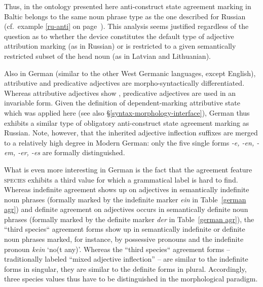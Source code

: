 Thus, in the ontology presented here anti\hyp{}construct state agreement marking in Baltic belongs to the same noun phrase type as the one described for Russian (cf.~example \ref{ru-anti} on page~\pageref{ru-anti}). This analysis seems justified regardless of the question as to whether the device constitutes the default type of adjective attribution marking (as in Russian) or is restricted to a given semantically restricted subset of the head noun (as in Latvian and Lithuanian).

Also in German (similar to the other West Germanic languages, except English), attributive and predicative adjectives are morpho-syntactically differentiated. Whereas attributive adjectives show , predicative adjectives are used in an invariable form. Given the definition of dependent\hyp{}marking attributive state which was applied here (see also \S\ref{syntax-morphology-interface}), German thus exhibits a similar type of obligatory anti\hyp{}construct state agreement marking as Russian. Note, however, that the inherited adjective inflection suffixes are merged to a relatively high degree in Modern German: only the five single forms \textit{-e, -en, -em, -er, -es} are formally distinguished.

What is even more interesting in German is the fact that the agreement feature \textsc{species} exhibits a third value for which a grammatical label is hard to find. Whereas indefinite agreement shows up on adjectives in semantically indefinite noun phrases (formally marked by the indefinite marker \textit{ein} in Table~\ref{german agr}) and definite agreement on adjectives occurs in semantically definite noun phrases (formally marked by the definite marker \textit{der} in Table~\ref{german agr}), the “third species“ agreement forms show up in semantically indefinite or definite noun phrases marked, for instance, by possessive pronouns and the indefinite pronoun \textit{kein} ‘no(t any)’. Whereas the “third species“ agreement forms – traditionally labeled “mixed adjective inflection” \citep[cf.][244–245]{schafer2015a} – are similar to the indefinite forms in singular, they are similar to the definite forms in plural. Accordingly, three species values thus have to be distinguished in the morphological paradigm.

